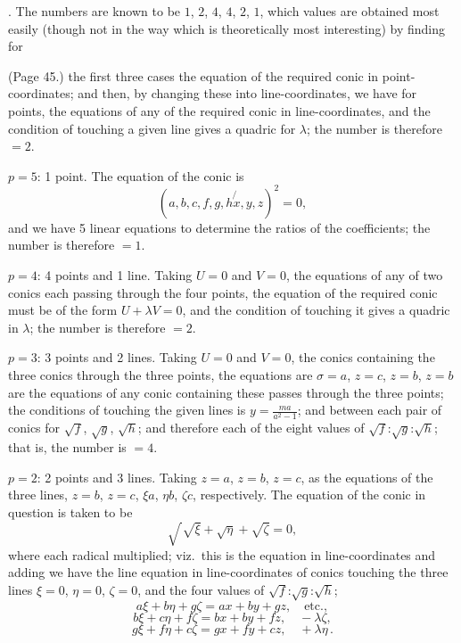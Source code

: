 \documentclass[11pt,a4paper]{article}
\begin{document}
\medskip

. The numbers are known to be $1$, $2$, $4$, $4$, $2$, $1$, which values are obtained most easily (though not in the way which is theoretically most interesting) by finding for

\bigskip

\noindent (Page 45.) the first three cases the equation of the required conic in point-coordinates; and then, by changing these into line-coordinates, we have for points, the equations of any of the required conic in line-coordinates, and the condition of touching a given line gives a quadric for $\lambda$; the number is therefore $= 2$.

\medskip

\noindent $p = 5$: 1 point. The equation of the conic is
\[
(a, b, c, f, g, h\!\!\not{x}, y, z)^2 = 0,
\]
and we have 5 linear equations to determine the ratios of the coefficients; the number is therefore $= 1$.

\medskip

\noindent $p = 4$: 4 points and 1 line. Taking $U = 0$ and $V = 0$, the equations of any of two conics each passing through the four points, the equation of the required conic must be of the form $U + \lambda V = 0$, and the condition of touching it gives a quadric in $\lambda$; the number is therefore $= 2$.

\medskip

\noindent $p = 3$: 3 points and 2 lines. Taking $U = 0$ and $V = 0$, the conics containing the three conics through the three points, the equations are $\sigma = a$, $z = c$, $z = b$, $z = b$ are the equations of any conic containing these passes through the three points; the conditions of touching the given lines is $y = \frac{ma}{a^2 - 1}$; and between each pair of conics for $\sqrt{f}$, $\sqrt{g}$, $\sqrt{h}$; and therefore each of the eight values of $\sqrt{f}$:$\sqrt{g}$:$\sqrt{h}$; that is, the number is $= 4$.

\medskip

\noindent $p = 2$: 2 points and 3 lines. Taking $z = a$, $z = b$, $z = c$, as the equations of the three lines, $z = b$, $z = c$, $\xi a$, $\eta b$, $\zeta c$, respectively. The equation of the conic in question is taken to be
\[
\sqrt{\frac{}{}} \sqrt{\xi} + \sqrt{\eta} + \sqrt{\zeta} = 0,
\]
where each radical multiplied; viz.\ this is the equation in line-coordinates and adding we have the line equation in line-coordinates of conics touching the three lines $\xi = 0$, $\eta = 0$, $\zeta = 0$, and the four values of $\sqrt{f}$:$\sqrt{g}$:$\sqrt{h}$;
\[
a\xi + b\eta + g\zeta = ax + by + gz, \quad \text{etc.},
\]
\[
b\xi + c\eta + f\zeta = bx + by + fz, \quad - \lambda \zeta,
\]
\[
g\xi + f\eta + c\zeta = gx + fy + cz, \quad + \lambda \eta\,.
\]
\end{document}
